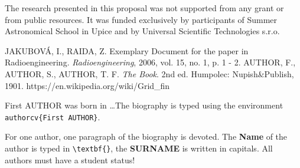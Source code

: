 \documentclass{poster16}
\begin{document}
The research presented in this proposal was not supported from any grant or from public resources. It was funded exclusively by participants of Summer Astronomical School in Upice and by Universal Scientific Technologies s.r.o. 

\begin{thebibliography}{9}
JAKUBOV\'A, I., RAIDA, Z. Exemplary Document for the paper in Radioengineering. \emph{Radioengineering}, 2006, vol. 15, no. 1, p. 1 - 2.
AUTHOR, F., AUTHOR, S., AUTHOR, T. F. \emph{The Book}. 2nd ed. Humpolec: Nupish\&Publish, 1901.
https://en.wikipedia.org/wiki/Grid\_fin
\end{thebibliography}


\begin{authorcv}{First AUTHOR}
was born in \dots The biography is typed using the environment \verb+authorcv{First AUTHOR}+. 

For one author, one paragraph of the biography is devoted. The \textbf{Name} of the author is typed in  \verb+\textbf{}+, the \textbf{SURNAME} is written in capitals.  All authors must have a student status!
\end{authorcv}
\end{document}
